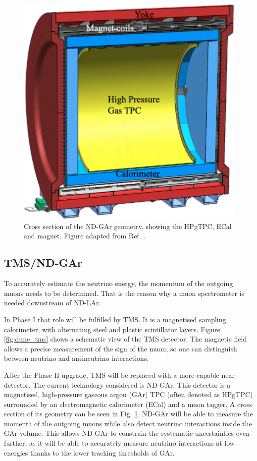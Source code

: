 \begin{figure}[t]
	\centering
	\includegraphics[width=0.45\linewidth]{Images/DUNE/ND/nd_gar}
	\caption[Cross section of the ND-GAr geometry, showing the HPgTPC, ECal and magnet.]{Cross section of the ND-GAr geometry, showing the HPgTPC, ECal and magnet. Figure adapted from Ref. \cite{DUNE2024Phase2}.}
	\label{fig:dune_nd_gar}
\end{figure}

\subsection{TMS/ND-GAr}

To accurately estimate the neutrino energy, the momentum of the outgoing muons needs to be determined. That is the reason why a muon spectrometer is needed downstream of ND-LAr.

In Phase I that role will be fulfilled by TMS. It is a magnetised sampling calorimeter, with alternating steel and plastic scintillator layers. Figure \ref{fig:dune_tms} shows a schematic view of the TMS detector. The magnetic field allows a precise measurement of the sign of the muon, so one can distinguish between neutrino and antineutrino interactions.

After the Phase II upgrade, TMS will be replaced with a more capable near detector. The current technology considered is ND-GAr. This detector is a magnetised, high-pressure gaseous argon (GAr) TPC (often denoted as HPgTPC) surrounded by an electromagnetic calorimeter (ECal) and a muon tagger. A cross section of its geometry can be seen in Fig. \ref{fig:dune_nd_gar}. ND-GAr will be able to measure the momenta of the outgoing muons while also detect neutrino interactions inside the GAr volume. This allows ND-GAr to constrain the systematic uncertainties even further, as it will be able to accurately measure neutrino interactions at low energies thanks to the lower tracking thresholds of GAr.

